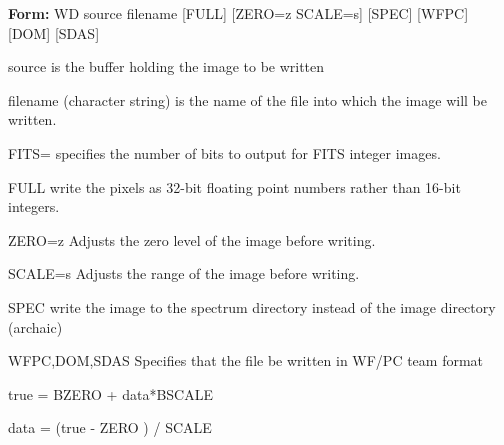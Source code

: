 {\newpage\clearpage
{}%
\begin{command}
  \item[\textbf{Form: } WD source filename {[FULL]} {[ZERO=z
       SCALE=s]} {[SPEC]} {[WFPC]} {[DOM]} {[SDAS]}\hfill]{}
\par
\item[source]{is the buffer holding the image to be written}
\par
\item[filename]{(character string) is the name of the file into which the
                 image will be written.}
\par
\item[FITS=]{specifies the number of bits to output for FITS integer images.}
\par
\item[FULL]{write the pixels as 32-bit floating point numbers rather than
       16-bit integers.}
\par
\item[ZERO=z]{Adjusts the zero level of the image before writing.}
\par
\item[SCALE=s]{Adjusts the range of the image before writing.}
\par
\item[SPEC]{write the image to the spectrum directory instead of the
       image directory (archaic)}
\par
\item[WFPC,DOM,SDAS]{Specifies that the file be written in WF/PC team format}
\end{command}%
\lthtmlfigureZ
\lthtmlcheckvsize\clearpage}

{\newpage\clearpage
{}%
\begin{hanging}
  \item{true = BZERO + data*BSCALE}
\end{hanging}%
\lthtmlfigureZ
\lthtmlcheckvsize\clearpage}

{\newpage\clearpage
{}%
\begin{hanging}
  \item{data = (true - ZERO ) / SCALE}
\end{hanging}%
\lthtmlfigureZ
\lthtmlcheckvsize\clearpage}


